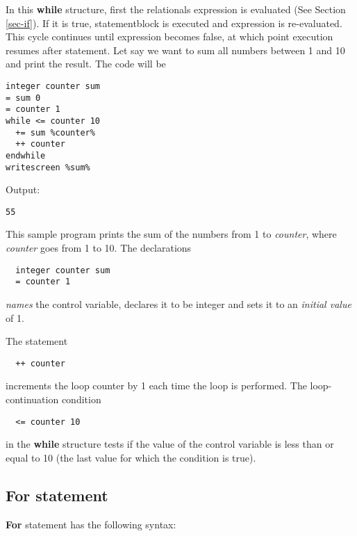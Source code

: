\documentclass[a4paper,12pt]{book}
\begin{document}
In this {\bf while} structure, first the relationals expression is evaluated (See Section \ref{sec-if}).  If it is true, statementblock is executed and expression is re-evaluated. This cycle continues until expression becomes false, at which point execution resumes after statement. Let say we want to sum all numbers between 1 and 10 and print the result. The code will be
\begin{verbatim}
integer counter sum
= sum 0
= counter 1
while <= counter 10
  += sum %counter%
  ++ counter
endwhile 
writescreen %sum%
\end{verbatim}

Output:
\begin{verbatim}
55
\end{verbatim}

This sample program prints the sum of the numbers from 1 to \textsl{counter}, where \textsl{counter} goes from 1 to 10. The declarations
\noindent
\begin{verbatim}
  integer counter sum
  = counter 1
\end{verbatim}
{\em names} the control variable, declares it to be integer and sets it to an {\em initial value} of 1.

The statement
\noindent
\begin{verbatim}
  ++ counter
\end{verbatim}
increments the loop counter by 1 each time the loop is performed.  The loop-continuation condition 
\begin{verbatim}
  <= counter 10
\end{verbatim} 
in the {\bf while} structure tests if the value of the control variable is less than or equal to 10 (the last value for which the condition is true).

\subsection{For statement}
{\bf For} statement has the following syntax:
\begin{center}
\end{center}
\end{document}
